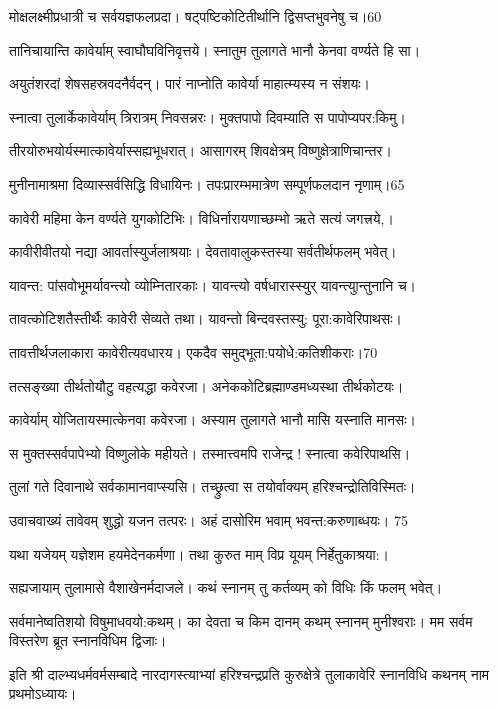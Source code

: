 मोक्षलक्ष्मीप्रधात्री च सर्वयज्ञफलप्रदा।
षट्पष्टिकोटितीर्थानि द्विसप्तभुवनेषु च।60

तानिचायान्ति कावेर्याम् स्वाघौघविनिवृत्तये।
स्नातुम तुलागते भानौ केनवा वर्ण्यते हि सा।

अयुतंशरदां शेषसहस्रवदनैर्वदन्।
पारं नाप्नोति कावेर्या माहात्म्यस्य न संशयः।

स्नात्वा तुलार्केकावेर्याम् त्रिरात्रम् निवसन्नरः।
मुक्तपापो दिवम्याति स पापोप्यपर:किमु।

तीरयोरुभयोर्यस्मात्कावेर्यास्सह्यभूधरात्।
आसागरम् शिवक्षेत्रम् विष्णुक्षेत्राणिचान्तर।

मुनीनामाश्रमा दिव्यास्सर्वसिद्धि विधायिनः।
तपःप्रारम्भमात्रेण सम्पूर्णफलदान नृणाम्।65

कावेरी महिमा केन वर्ण्यते युगकोटिभिः।
विधिर्नारायणाच्छम्भो ऋते सत्यं जगत्त्रये,।

कावीरीवीतयो नद्या आवर्तास्युर्जलाश्रयाः।
देवतावालुकस्तस्या सर्वतीर्थफलम् भवेत्।

यावन्त: पांसवोभूमर्यावन्त्यो व्योम्नितारकाः।
यावन्त्यो वर्षधारास्स्युर् यावन्त्युान्तुनानि च।

तावत्कोटिशतैस्तीर्थैः कावेरी सेव्यते तथा।
यावन्तो बिन्दवस्तस्यु: पूरा:कावेरिपाथसः।

तावत्तीर्थजलाकारा कावेरीत्यवधारय।
एकदैव समुद्भूता:पयोधे:कतिशीकराः।70

तत्सङ्ख्या तीर्थतोयौटु वहत्यद्धा कवेरजा।
अनेककोटिब्रह्माण्डमध्यस्था तीर्थकोटयः।

कावेर्याम् योजितायस्मात्केनवा कवेरजा।
अस्याम तुलागते भानौ मासि यस्नाति मानसः।

स मुक्तस्सर्वपापेभ्यो विष्णुलोके महीयते।
तस्मात्त्वमपि राजेन्द्र ! स्नात्वा कवेरिपाथसि।

तुलां गते दिवानाथे सर्वकामानवाप्स्यसि।
तच्छ्रुत्वा स तयोर्वाक्यम् हरिश्चन्द्रोतिविस्मितः।

उवाचवाख्यं तावेवम् शुद्धो यजन तत्परः।
अहं दासोरिम भवाम् भवन्त:करुणाब्धयः। 75

यथा यजेयम् यज्ञेशम हयमेदेनकर्मणा।
तथा कुरुत माम् विप्र यूयम् निर्हेतुकाश्रया:।

सह्यजायाम् तुलामासे वैशाखेनर्मदाजले।
कथं स्नानम् तु कर्तव्यम् को विधिः किं फलम् भवेत्।

सर्वमानेष्वतिशयो विषुमाधवयो:कथम्।
का देवता च किम दानम् कथम् स्नानम् मुनीश्वराः।
मम सर्वम विस्तरेण ब्रूत स्नानविधिम द्विजाः।

इति श्री दाल्भ्यधर्मवर्मसम्बादे नारदागस्त्याभ्यां हरिश्चन्द्रप्रति कुरुक्षेत्रे तुलाकावेरि स्नानविधि कथनम् नाम प्रथमोऽध्यायः।



